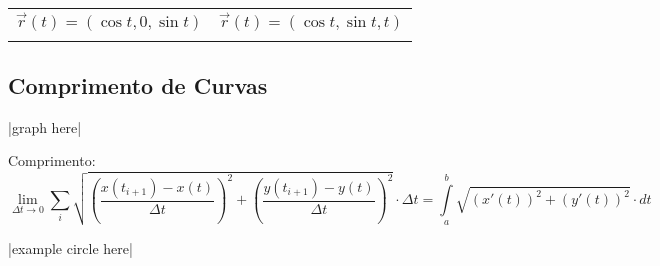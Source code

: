 \documentclass{article}
\begin{document}
\begin{tabular}{cc}
  $\vec{r}(t) = (\cos t, 0, \sin t)$ & $\vec{r}(t) = (\cos t, \sin t, t)$ \\[5pt]
  \vtop{\null\hbox{
    \begin{tikzpicture}
      \begin{axis}[
          view       = {120}{30},
          axis lines = middle,
          xlabel     = $x$,
          ylabel     = $y$,
          zlabel     = $z$,
          zmax       = 2,
          zmin       = -2,
          xmax       = 2,
          xmin       = -2,
          height     = 8cm,
          width      = 8cm,
          xtick      = \empty,
          ytick      = \empty,
          ztick      = \empty
        ]
        \addplot3+ [
          domain    = 0:2*pi,
          samples   = 400,
          samples y = 0,
          mark      = none,
          red,
        ]
        ( {cos(deg(x))}, {0}, {sin(deg(x))} );
      \end{axis}
    \end{tikzpicture}
  }}
  &
  \qquad\vtop{\null\hbox{
    \begin{tikzpicture}
      \begin{axis}[
          view       = {120}{30},
          axis lines = middle,
          xlabel     = $x$,
          ylabel     = $y$,
          zlabel     = $z$,
          zmax       = 60,
          xmax       = 2,
          xmin       = -1.5,
          ymax       = 2,
          ymin       = -1.5,
          height     = 8cm,
          width      = 8cm,
          xtick      = \empty,
          ytick      = \empty,
          ztick      = \empty
        ]
        \addplot3+ [
          domain     = 0:14.7*pi,
          samples    = 400,
          samples y  = 0,
          mark       = none,
          red,
        ]
        ( {cos(deg(x))},{sin(deg(x))},{x});
      \end{axis}
    \end{tikzpicture}
  }}
\end{tabular}

\subsection{Comprimento de Curvas}
\centerline{|graph here|}
Comprimento:
\[ \lim_{\Delta t \to 0} { \sum_i \sqrt{ {\left(\frac{x(t_{i+1}) - x(t)}{\Delta t}\right)}^2 + { \left(\frac {y(t_{i+1}) - y(t)}{\Delta t}\right) }^2 } \cdot \Delta t } = \int\limits_a^b \sqrt{{(x'(t))}^2 + {(y'(t))}^2} \cdot dt \]
\centerline{|example circle here|}
\end{document}
